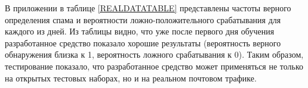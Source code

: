 В приложении в таблице \ref{REALDATATABLE} представлены частоты верного определения спама и вероятности ложно-положительного срабатывания для каждого из дней. Из таблицы видно, что уже после первого дня обучения  разработанное средство показало хорошие результаты (вероятность верного обнаружения близка к 1, вероятность ложного срабатывания к 0). Таким образом, тестирование показало, что разработанное средство может применяться не только на открытых тестовых наборах, но и на реальном почтовом трафике.


